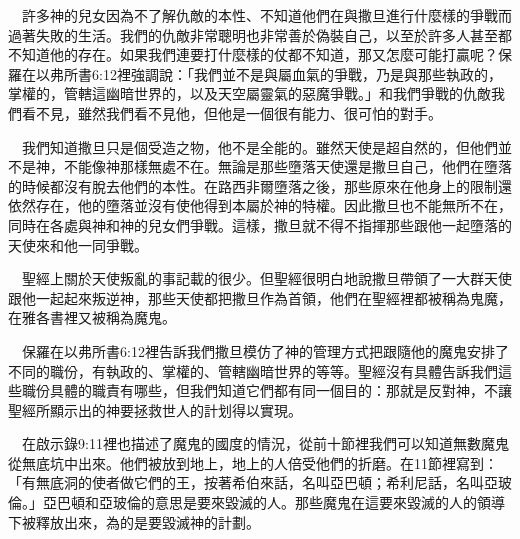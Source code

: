 \documentclass{book}
\begin{document}
\begin{center}
\noindent{}
\end{center}

　許多神的兒女因為不了解仇敵的本性、不知道他們在與撒旦進行什麼樣的爭戰而過著失敗的生活。我們的仇敵非常聰明也非常善於偽裝自己，以至於許多人甚至都不知道他的存在。如果我們連要打什麼樣的仗都不知道，那又怎麼可能打贏呢？保羅在以弗所書6:12裡強調說：「我們並不是與屬血氣的爭戰，乃是與那些執政的，掌權的，管轄這幽暗世界的，以及天空屬靈氣的惡魔爭戰。」和我們爭戰的仇敵我們看不見，雖然我們看不見他，但他是一個很有能力、很可怕的對手。

　我們知道撒旦只是個受造之物，他不是全能的。雖然天使是超自然的，但他們並不是神，不能像神那樣無處不在。無論是那些墮落天使還是撒旦自己，他們在墮落的時候都沒有脫去他們的本性。在路西非爾墮落之後，那些原來在他身上的限制還依然存在，他的墮落並沒有使他得到本屬於神的特權。因此撒旦也不能無所不在，同時在各處與神和神的兒女們爭戰。這樣，撒旦就不得不指揮那些跟他一起墮落的天使來和他一同爭戰。

　聖經上關於天使叛亂的事記載的很少。但聖經很明白地說撒旦帶領了一大群天使跟他一起起來叛逆神，那些天使都把撒旦作為首領，他們在聖經裡都被稱為鬼魔，在雅各書裡又被稱為魔鬼。

　保羅在以弗所書6:12裡告訴我們撒旦模仿了神的管理方式把跟隨他的魔鬼安排了不同的職份，有執政的、掌權的、管轄幽暗世界的等等。聖經沒有具體告訴我們這些職份具體的職責有哪些，但我們知道它們都有同一個目的：那就是反對神，不讓聖經所顯示出的神要拯救世人的計划得以實現。

　在啟示錄9:11裡也描述了魔鬼的國度的情況，從前十節裡我們可以知道無數魔鬼從無底坑中出來。他們被放到地上，地上的人倍受他們的折磨。在11節裡寫到：「有無底洞的使者做它們的王，按著希伯來話，名叫亞巴頓；希利尼話，名叫亞玻倫。」亞巴頓和亞玻倫的意思是要來毀滅的人。那些魔鬼在這要來毀滅的人的領導下被釋放出來，為的是要毀滅神的計劃。
\end{document}
